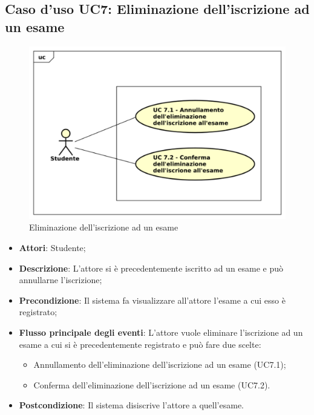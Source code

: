 \subsection{Caso d'uso \texorpdfstring{UC7}{UC7}: Eliminazione dell'iscrizione ad un esame}
\begin{figure} [H]
	\centering
	\includegraphics[scale=0.45]{./img/UC7.pdf}
	\caption{Eliminazione dell'iscrizione ad un esame}\label{}
\end{figure}
\begin{itemize}
	\item \textbf{Attori}: Studente;
	\item \textbf{Descrizione}: L'attore si è precedentemente iscritto ad un esame e può annullarne l'iscrizione;
	\item \textbf{Precondizione}: Il sistema fa visualizzare all'attore l'esame a cui esso è registrato;
	\item \textbf{Flusso principale degli eventi}: L'attore vuole eliminare l'iscrizione ad un esame a cui si è precedentemente registrato e può fare due scelte:
	\begin{itemize}
		\item Annullamento dell'eliminazione dell'iscrizione ad un esame (UC7.1);
		\item Conferma dell'eliminazione dell'iscrizione ad un esame (UC7.2).
	\end{itemize}
	\item \textbf{Postcondizione}: Il sistema disiscrive l'attore a quell'esame.
\end{itemize}
